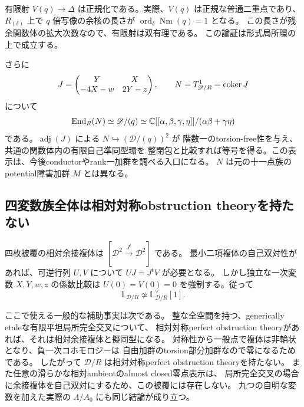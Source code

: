 有限射 $V(q)\to\Delta$ は正規化である。実際、$V(q)$ は正規な普通二重点であり、
$R_{(\delta)}$ 上で $q$ 倍写像の余核の長さが
$\operatorname{ord}_\delta\operatorname{Nm}(q)=1$ となる。
この長さが残余関数体の拡大次数なので、有限射は双有理である。
この論証は形式局所環の上で成立する。

さらに
\[
 J=\begin{pmatrix}Y&X\\-4X-w&2Y-z\end{pmatrix},\qquad
 N=T^1_{\mathscr D/R}=\operatorname{coker} J
\]
について
\[
 \operatorname{End}_R(N)\simeq\mathscr D/(q)
 \simeq\mathbb C[[\alpha,\beta,\gamma,\eta]]/(\alpha\beta+\gamma\eta)
\]
である。$\operatorname{adj}(J)$ による $N\hookrightarrow(\mathscr D/(q))^2$ が
階数一のtorsion-free性を与え、共通の関数体内の有限自己準同型環を
整閉包と比較すれば等号を得る。この表示は、今後conductorやrank一加群を調べる入口になる。
$N$ は元の十一点族のpotential障害加群 $M$ とは異なる。

\subsection{四変数族全体は相対対称obstruction theoryを持たない}
四枚被覆の相対余接複体は
$[\mathscr D^2\xrightarrow{J^t}\mathscr D^2]$ である。
最小二項複体の自己双対性があれば、可逆行列 $U,V$ について
$UJ=J^tV$ が必要となる。
しかし独立な一次変数 $X,Y,w,z$ の係数比較は
$U(0)=V(0)=0$ を強制する。従って
\[
 \mathbb L_{\mathscr D/R}\not\simeq\mathbb L_{\mathscr D/R}^{\vee}[1].
\]

ここで使える一般的な補助事実は次である。
整な全空間を持つ、generically etaleな有限平坦局所完全交叉について、
相対対称perfect obstruction theoryがあれば、それは相対余接複体と擬同型になる。
対称性から一般点で複体は非輪状となり、負一次コホモロジーは
自由加群のtorsion部分加群なので零になるためである。
したがって $\mathscr D/R$ は相対対称perfect obstruction theoryを持たない。
また任意の滑らかな相対ambientのalmost closed零点表示は、
局所完全交叉の場合に余接複体を自己双対にするため、この被覆には存在しない。
九つの自明な変数を加えた実際の $\Lambda/A_0$ にも同じ結論が成り立つ。

